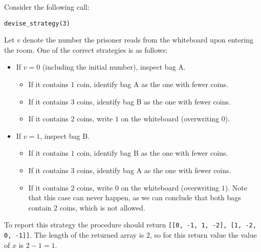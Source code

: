 Consider the following call:

\texttt{devise\_strategy(3)}


Let $v$ denote the number the prisoner reads from the whiteboard upon entering the room.
One of the correct strategies is as follows:
\begin{itemize}
    \item If $v = 0$ (including the initial number), inspect bag A.
    \begin{itemize}
    \item If it contains $1$ coin, identify bag A as the one with fewer coins.
  \item If it contains $3$ coins, identify bag B as the one with fewer coins.
  \item If it contains $2$ coins, write $1$ on the whiteboard (overwriting $0$).
  \end{itemize}
\item If $v = 1$, inspect bag B.
\begin{itemize}
  \item If it contains $1$ coin, identify bag B as the one with fewer coins.
  \item If it contains $3$ coins, identify bag A as the one with fewer coins.
  \item If it contains $2$ coins, write $0$ on the whiteboard (overwriting $1$). Note that this case can never happen, as we can conclude that both bags contain $2$ coins, which is not allowed.
\end{itemize}
\end{itemize}
To report this strategy the procedure should return \texttt{[[0, -1, 1, -2], [1, -2, 0, -1]]}.
The length of the returned array is $2$, so for this return value the value of $x$ is $2 - 1 = 1$.
